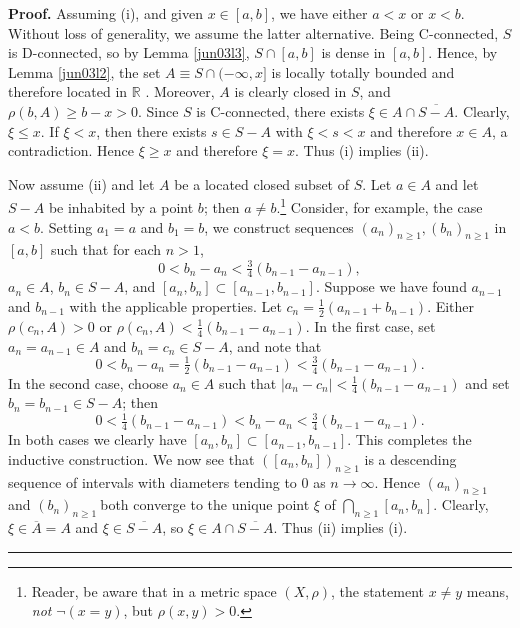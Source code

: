 \documentclass[11pt]{article}%
\newenvironment{proof}[1][Proof]{\noindent\textbf{#1.} }{\ \rule{0.5em}{0.5em}}
\begin{document}
\begin{proof}
Assuming (i), and given $x\in\left[  a,b\right]  $, we have either $a<x$ or
$x<b$. Without loss of generality, we assume the latter alternative. Being
C-connected, $S$ is D-connected, so by Lemma \ref{jun03l3}, $S\cap\left[
a,b\right]  $ is dense in $\left[  a,b\right]  $. Hence, by Lemma
\ref{jun03l2}, the set $A\equiv S\cap(-\infty,x]$ is locally totally bounded
and therefore located in $\mathbb{R}$ \cite[2.2.18]{bv}. Moreover, $A$ is
clearly closed in $S$, and $\rho(b,A)\geq b-x>0$. Since $S$ is C-connected,
there exists $\xi\in A\cap\overline{S-A}$. Clearly, $\xi\leq x$. If $\xi<x$,
then there exists $s\in S-A$ with $\xi<s<x$ and therefore $x\in A$, a
contradiction. Hence $\xi\geq x$ and therefore $\xi=x$. Thus (i) implies (ii).

Now assume (ii) and let $A$ be a located closed subset of $S$. Let $a\in A$
and let $S-A$ be inhabited by a point $b$; then $a\neq b$.\footnote{%
\normalfont\sf
Reader, be aware that in a metric space $\left(  X,\rho\right)  $, the
statement $x\neq y$ means, \emph{not }$\lnot(x=y)$, but $\rho(x,y)>0$.}
Consider, for example, the case $a<b$. Setting $a_{1}=a$ and $b_{1}=b$, we
construct sequences $\left(  a_{n}\right)  _{n\geq1},\left(  b_{n}\right)
_{n\geq1}$ in $\left[  a,b\right]  $ such that for each $n>1$,%
\[
0<b_{n}-a_{n}<\tfrac{3}{4}(b_{n-1}-a_{n-1}),
\]
$a_{n}\in A$, $b_{n}\in S-A$, and $\left[  a_{n},b_{n}\right]  \subset\left[
a_{n-1},b_{n-1}\right]  $. Suppose we have found $a_{n-1}$ and $b_{n-1}$ with
the applicable properties. Let $c_{n}=\frac{1}{2}\left(  a_{n-1}%
+b_{n-1}\right)  $. Either $\rho(c_{n},A)>0$ or $\rho(c_{n},A)<\frac{1}%
{4}\left(  b_{n-1}-a_{n-1}\right)  $. In the first case, set $a_{n}=a_{n-1}\in
A$ and $b_{n}=c_{n}\in S-A$, and note that%
\[
0<b_{n}-a_{n}=\tfrac{1}{2}\left(  b_{n-1}-a_{n-1}\right)  <\tfrac{3}{4}\left(
b_{n-1}-a_{n-1}\right)  .
\]
In the second case, choose $a_{n}\in A$ such that $\left\vert a_{n}%
-c_{n}\right\vert <\frac{1}{4}\left(  b_{n-1}-a_{n-1}\right)  $ and set
$b_{n}=b_{n-1}\in S-A$; then%
\[
0<\tfrac{1}{4}\left(  b_{n-1}-a_{n-1}\right)  <b_{n}-a_{n}<\tfrac{3}{4}\left(
b_{n-1}-a_{n-1}\right)  .
\]
In both cases we clearly have $\left[  a_{n},b_{n}\right]  \subset\left[
a_{n-1},b_{n-1}\right]  $. This completes the inductive construction. We now
see that $\left(  \left[  a_{n},b_{n}\right]  \right)  _{n\geq1}$ is a
descending sequence of intervals with diameters tending to $0$ as
$n\rightarrow\infty$. Hence $\left(  a_{n}\right)  _{n\geq1}$ and $\left(
b_{n}\right)  _{n\geq1}~$both converge to the unique point $\xi$ of $%
{\textstyle\bigcap_{n\geq1}}
\left[  a_{n},b_{n}\right]  $. Clearly, $\xi\in\overline{A}=A$ and $\xi
\in\overline{S-A}$, so $\xi\in A\cap\overline{S-A}$. Thus (ii) implies (i).
\end{proof}
\end{document}
